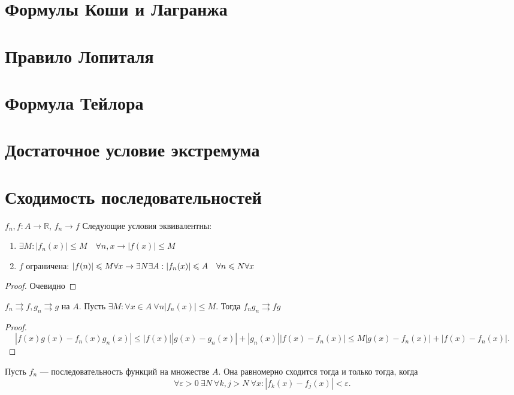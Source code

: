 \documentclass[11pt]{book}
\newcommand{\R}{\mathbb{R}}
\renewcommand{\le}{\leqslant}
\theoremstyle{definition}
\theoremstyle{plain}
\theoremstyle{plain}
\theoremstyle{definition}
\theoremstyle{remark}
\begin{document}
\section{Формулы Коши и Лагранжа}
\section{Правило Лопиталя}
\section{Формула Тейлора}
\section{Достаточное условие экстремума}
\section{Сходимость последовательностей}
\begin{thm}
    $f_n, f : A \to  \R$, $f_n \to  f$
    Следующие условия эквивалентны:
    \begin{enumerate}
	\item $\exists M : |f_n(x)| \le  M \quad \forall  n, x \longrightarrow |f(x)| \le  M$
	\item $f$ ограничена: $|f(n)| \le  M \forall  x \to \exists  N \exists  A: \\
	    |f_n(x)| \le A \quad \forall  n \le  N \forall  x$
    \end{enumerate}
\end{thm}
\begin{proof}
    Очевидно
\end{proof}
\begin{thm}
    $f_n \rightrightarrows  f, g_n \rightrightarrows  g$ на $A$.
    Пусть $\exists M: \forall x \in A ~\forall  n |f_n(x) | \le  M$. Тогда  $f_n g_n \rightrightarrows fg$
\end{thm}
\begin{proof}
    \[
	|f(x) g(x) - f_n(x) g_n(x)| \le  |f(x) ||g(x) - g_n(x) | + | g_n(x)| |f(x) - f_n(x)| \le  M | g(x) - f_n(x)  |+ | f(x) - f_n(x)|
    .\]
\end{proof}
\begin{thm}
    Пусть $f_n$ --- последовательность функций на множестве $A$. Она равномерно сходится  тогда и только тогда, когда
    \[
	\forall  \varepsilon >0~ \exists  N ~ \forall  k, j> N~ \forall x : |f_k(x) - f_j(x)| < \varepsilon
    .\] \label{usl}
\end{thm}
\end{document}
